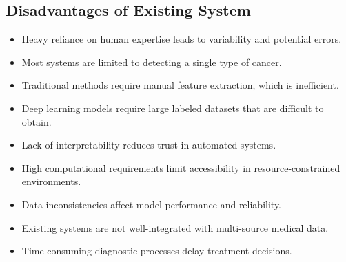 \documentclass[a4paper,12pt]{report}
\begin{document}
\begin{doublespace}
\section{Disadvantages of Existing System}
\label{sec:2.12}
\begin{itemize}
\item Heavy reliance on human expertise leads to variability and potential errors.
\item Most systems are limited to detecting a single type of cancer.
\item Traditional methods require manual feature extraction, which is inefficient.
\item Deep learning models require large labeled datasets that are difficult to obtain.
\item Lack of interpretability reduces trust in automated systems.
\item High computational requirements limit accessibility in resource-constrained environments.
\item Data inconsistencies affect model performance and reliability.
\item Existing systems are not well-integrated with multi-source medical data.
\item Time-consuming diagnostic processes delay treatment decisions.
\end{itemize}
\end{doublespace}
\newpage
\end{document}
